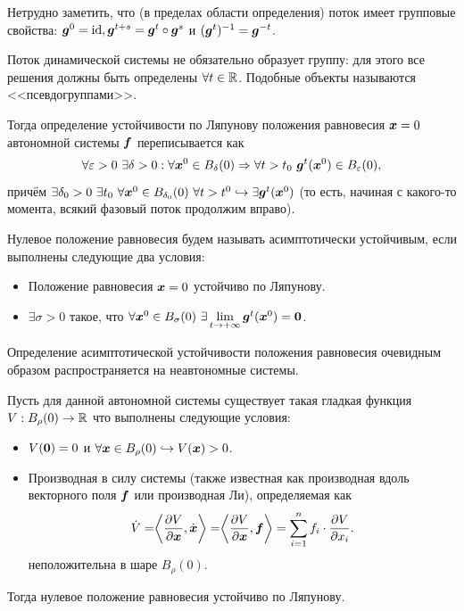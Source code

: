 Нетрудно заметить, что (в пределах области определения) поток имеет групповые свойства: $\boldsymbol{g}^0 = \operatorname{id}, \boldsymbol{g}^{t + s} = \boldsymbol{g}^t \circ \boldsymbol{g}^s$ и $(\boldsymbol{g}^{t})^{-1} = \boldsymbol{g}^{-t}$.
\begin{note}
    Поток динамической системы не обязательно образует группу: для этого все решения должны быть определены $\forall t \in \mathbb{R}$.
    Подобные объекты называются <<псевдогруппами>>.
\end{note}
\begin{definition}
    Тогда определение устойчивости по Ляпунову положения равновесия $\boldsymbol{x} = 0$ автономной системы $\boldsymbol{f}$ переписывается как
    \[
        \forall \epsilon > 0 \ \exists \delta > 0: \forall \bt{x}^0 \in B_{\delta}(0) \Ra \forall t > t_0 \ \bt{g}^t(\bt{x}^0) \in B_{\epsilon}(0),
    \]
    причём $\exists \delta_0 > 0 \  \exists t_0 \  \forall \boldsymbol{x}^0 \in B_{\delta_0}(0) \   \forall t > t^0 \hookrightarrow \exists  \boldsymbol{g}^t(\boldsymbol{x}^0)$ (то есть, начиная с какого-то момента, всякий фазовый поток продолжим вправо).
\end{definition}
\begin{definition}
    Нулевое положение равновесия будем называть асимптотически устойчивым, если выполнены следующие два условия:
    \begin{itemize}
        \item Положение равновесия $\boldsymbol{x} = 0$ устойчиво по Ляпунову.
        \item $\exists \sigma > 0$ такое, что $\forall \boldsymbol{x}^0 \in B_\sigma(0) \  \exists \lim\limits_{t \rightarrow +\infty} \boldsymbol{g}^t(\boldsymbol{x}^0) = \boldsymbol{0}$.
    \end{itemize}
\end{definition}
\begin{note}
    Определение асимптотической устойчивости положения равновесия очевидным образом распространяется на неавтономные системы.
\end{note}
\begin{theorem}
    Пусть для данной автономной системы существует такая гладкая функция $V: B_\rho(0) \to \mathbb{R}$ что выполнены следующие условия:
    \begin{itemize}
        \item[1.] $V(\boldsymbol{0}) = 0$ и $\forall \boldsymbol{x} \in B_{\rho}(0) \hookrightarrow V(\boldsymbol{x}) > 0$.
        \item[2.] Производная в силу системы (также известная как производная вдоль векторного поля $\boldsymbol{f}$ или производная Ли), определяемая как
        \[
            \dot{V} =\biggr\langle \dfrac{\partial V}{\partial \boldsymbol{x}}, \dot{\boldsymbol{x}} \biggr\rangle =  \biggr\langle \dfrac{\partial V}{\partial \boldsymbol{x}}, \boldsymbol{f} \biggr\rangle = \sum\limits_{i = 1}^n f_i \cdot \dfrac{\partial V}{\partial x_i}.
        \]
        неположительна в шаре $B_{\rho}(0)$.
    \end{itemize}
    Тогда нулевое положение равновесия устойчиво по Ляпунову.
\end{theorem}

